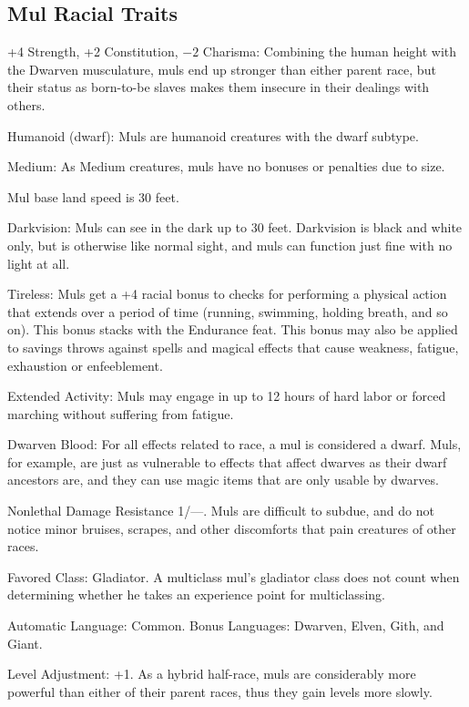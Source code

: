 \subsection{Mul Racial Traits}
\begin{itemize*}
    \item +4 Strength, +2 Constitution, $-2$ Charisma: Combining the human height with the Dwarven musculature, muls end up stronger than either parent race, but their status as born-to-be slaves makes them insecure in their dealings with others.
    \item Humanoid (dwarf): Muls are humanoid creatures with the dwarf subtype.
    \item Medium: As Medium creatures, muls have no bonuses or penalties due to size.
    \item Mul base land speed is 30 feet.
    \item Darkvision: Muls can see in the dark up to 30 feet. Darkvision is black and white only, but is otherwise like normal sight, and muls can function just fine with no light at all.
    \item Tireless: Muls get a +4 racial bonus to checks for performing a physical action that extends over a period of time (running, swimming, holding breath, and so on). This bonus stacks with the Endurance feat. This bonus may also be applied to savings throws against spells and magical effects that cause weakness, fatigue, exhaustion or enfeeblement.
    \item Extended Activity: Muls may engage in up to 12 hours of hard labor or forced marching without suffering from fatigue.
    \item Dwarven Blood: For all effects related to race, a mul is considered a dwarf. Muls, for example, are just as vulnerable to effects that affect dwarves as their dwarf ancestors are, and they can use magic items that are only usable by dwarves.
    \item Nonlethal Damage Resistance 1/---. Muls are difficult to subdue, and do not notice minor bruises, scrapes, and other discomforts that pain creatures of other races.
    \item Favored Class: Gladiator. A multiclass mul's gladiator class does not count when determining whether he takes an experience point for multiclassing.
    \item Automatic Language: Common. Bonus Languages: Dwarven, Elven, Gith, and Giant.
    \item Level Adjustment: +1. As a hybrid half-race, muls are considerably more powerful than either of their parent races, thus they gain levels more slowly.
\end{itemize*}